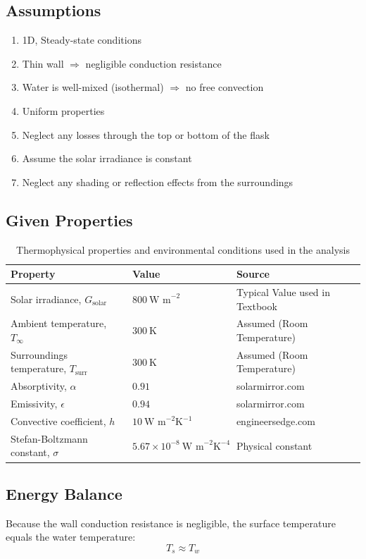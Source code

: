 \documentclass[12pt]{article}
\begin{document}
\subsection*{Assumptions}
\begin{enumerate}
\item 1D, Steady-state conditions
\item Thin wall $\Rightarrow$ negligible conduction resistance
\item Water is well-mixed (isothermal) $\Rightarrow$ no free convection
\item Uniform properties
\item Neglect any losses through the top or bottom of the flask
\item Assume the solar irradiance is constant
\item Neglect any shading or reflection effects from the surroundings 
\end{enumerate}

\subsection*{Given Properties}

\begin{table}[H]
\centering
\caption{Thermophysical properties and environmental conditions used in the analysis}
\begin{tabular}{lll}
\toprule
\textbf{Property} & \textbf{Value} & \textbf{Source} \\
\midrule
Solar irradiance, $G_{\text{solar}}$ & $800~\text{W m}^{-2}$ & Typical Value used in Textbook\\
Ambient temperature, $T_\infty$ & $300~\text{K}$ & Assumed (Room Temperature) \\
Surroundings temperature, $T_{\text{surr}}$ & $300~\text{K}$ & Assumed (Room Temperature) \\
Absorptivity, $\alpha$ & $0.91$ & solarmirror.com \\
Emissivity, $\epsilon$ & $0.94$ & solarmirror.com \\
Convective coefficient, $h$ & $10~\text{W m}^{-2}\text{K}^{-1}$ & engineersedge.com \\
Stefan-Boltzmann constant, $\sigma$ & $5.67 \times 10^{-8}~\text{W m}^{-2}\text{K}^{-4}$ & Physical constant \\
\bottomrule
\end{tabular}
\end{table}

\subsection*{Energy Balance}
Because the wall conduction resistance is negligible, the surface temperature equals the water temperature:
\begin{equation}
T_s \approx T_w
\end{equation}
\end{document}
